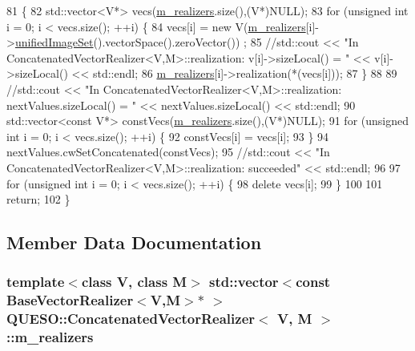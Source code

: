 \begin{DoxyCode}
81 \{
82   std::vector<V*> vecs(\hyperlink{class_q_u_e_s_o_1_1_concatenated_vector_realizer_a1be059d72ef9d1296928d345774e89c7}{m\_realizers}.size(),(V*)NULL);
83   \textcolor{keywordflow}{for} (\textcolor{keywordtype}{unsigned} \textcolor{keywordtype}{int} i = 0; i < vecs.size(); ++i) \{
84     vecs[i] = \textcolor{keyword}{new} V(\hyperlink{class_q_u_e_s_o_1_1_concatenated_vector_realizer_a1be059d72ef9d1296928d345774e89c7}{m\_realizers}[i]->\hyperlink{class_q_u_e_s_o_1_1_base_vector_realizer_ad958991bab8d6369e8a0d66b22a237d4}{unifiedImageSet}().vectorSpace().zeroVector())
      ;
85     \textcolor{comment}{//std::cout << "In ConcatenatedVectorRealizer<V,M>::realization: v[i]->sizeLocal() = " <<
       v[i]->sizeLocal() << std::endl;}
86     \hyperlink{class_q_u_e_s_o_1_1_concatenated_vector_realizer_a1be059d72ef9d1296928d345774e89c7}{m\_realizers}[i]->realization(*(vecs[i]));
87   \}
88 
89   \textcolor{comment}{//std::cout << "In ConcatenatedVectorRealizer<V,M>::realization: nextValues.sizeLocal() = " <<
       nextValues.sizeLocal() << std::endl;}
90   std::vector<const V*> constVecs(\hyperlink{class_q_u_e_s_o_1_1_concatenated_vector_realizer_a1be059d72ef9d1296928d345774e89c7}{m\_realizers}.size(),(V*)NULL);
91   \textcolor{keywordflow}{for} (\textcolor{keywordtype}{unsigned} \textcolor{keywordtype}{int} i = 0; i < vecs.size(); ++i) \{
92     constVecs[i] = vecs[i];
93   \}
94   nextValues.cwSetConcatenated(constVecs);
95   \textcolor{comment}{//std::cout << "In ConcatenatedVectorRealizer<V,M>::realization: succeeded" << std::endl;}
96 
97   \textcolor{keywordflow}{for} (\textcolor{keywordtype}{unsigned} \textcolor{keywordtype}{int} i = 0; i < vecs.size(); ++i) \{
98     \textcolor{keyword}{delete} vecs[i];
99   \}
100 
101   \textcolor{keywordflow}{return};
102 \}
\end{DoxyCode}


\subsection{Member Data Documentation}
\hypertarget{class_q_u_e_s_o_1_1_concatenated_vector_realizer_a1be059d72ef9d1296928d345774e89c7}{
\subsubsection[{m\-\_\-realizers}]{\setlength{\rightskip}{0pt plus 5cm}template$<$class V, class M$>$ std\-::vector$<$const {\bf Base\-Vector\-Realizer}$<$V,M$>$$\ast$ $>$ {\bf Q\-U\-E\-S\-O\-::\-Concatenated\-Vector\-Realizer}$<$ V, M $>$\-::m\-\_\-realizers\hspace{0.3cm}{\ttfamily [private]}}}\label{class_q_u_e_s_o_1_1_concatenated_vector_realizer_a1be059d72ef9d1296928d345774e89c7}


